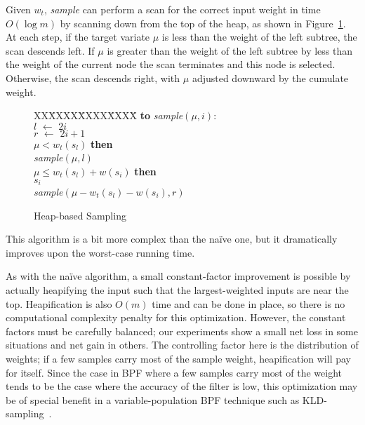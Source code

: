\documentclass[12pt]{article}
\newcommand{\asgn}{\,\,\leftarrow\,\,}
\begin{document}
  Given $w_t$, {\em sample} can perform a scan for the
  correct input weight in time $O(\log m)$ by scanning down
  from the top of the heap, as shown in
  Figure~\ref{fig-onlm}.  At each step, if the target
  variate $\mu$ is less than the weight of the left subtree,
  the scan descends left.  If $\mu$ is greater than the
  weight of the left subtree by less than the weight of the
  current node the scan terminates and this node is
  selected.  Otherwise, the scan descends right, with
  $\mu$ adjusted downward by the cumulate weight.

  \begin{figure}
    \centering
    \begin{minipage}{0.6\textwidth}
      \begin{tabbing}
      XX\=XXXX\=XXXX\=XXXX\=\kill
      {\bf to} {\it sample}$(\mu,i)$: \\
      \>$l \asgn 2i$ \\
      \>$r \asgn 2i + 1$ \\
       $\mu < w_t(s_l)$ {\bf then} \\
      \> {\it sample}$(\mu, l)$ \\
       $\mu \le w_t(s_l) + w(s_i)$ {\bf then} \\
      \> $s_i$ \\
       {\it sample}$(\mu - w_t(s_l) - w(s_i), r)$
    \end{tabbing}
    \end{minipage}
    \caption{Heap-based Sampling}\label{fig-onlm}
  \end{figure}

  This algorithm is a bit more complex than the na\"ive one,
  but it dramatically improves upon the worst-case running
  time.

  As with the na\"ive algorithm, a small constant-factor
  improvement is possible by actually heapifying the input
  such that the largest-weighted inputs are near the top.
  Heapification is also $O(m)$ time and can be done in
  place, so there is no computational complexity penalty for
  this optimization.  However, the constant factors must be
  carefully balanced; our experiments show a small net loss
  in some situations and net gain in others.  The
  controlling factor here is the distribution of weights; if
  a few samples carry most of the sample weight,
  heapification will pay for itself.  Since the case in BPF where a
  few samples carry most of the weight tends to be the case where the
  accuracy of the filter is low, this optimization may be of
  special benefit in a variable-population BPF technique
  such as KLD-sampling~\cite{kld}.
\end{document}
